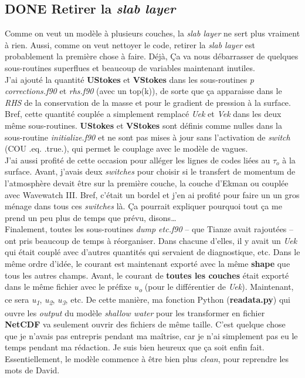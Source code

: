 \documentclass[10pt]{article}
\numberwithin{equation}{section}
\begin{document}
\subsection{{\bfseries\sffamily DONE} Retirer la \emph{slab layer}}
\label{sec:orgb0eaa03}
Comme on veut un modèle à plusieurs couches, la \emph{slab layer} ne sert plus vraiment à rien.
Aussi, comme on veut nettoyer le code, retirer la \emph{slab layer} est probablement la première chose à faire. 
Déjà, Ça va nous débarrasser de quelques sous-routines superflues et beaucoup de variables maintenant inutiles.\\[0pt]

J'ai ajouté la quantité \textbf{UStokes} et \textbf{VStokes} dans les sous-routines \emph{p corrections.f90} et \emph{rhs.f90} (avec un top(k)), de sorte que ça apparaisse dans le \emph{RHS} de la conservation de la masse et pour le gradient de pression à la surface. 
Bref, cette quantité couplée a simplement remplacé \emph{Uek} et \emph{Vek} dans les deux même sous-routines.
\textbf{UStokes} et \textbf{VStokes} sont définis comme nulles dans la sous-routine \emph{initialize.f90} et ne sont pas mises à jour sans l'activation de \emph{switch} (COU .eq. .true.), qui permet le couplage avec le modèle de vagues.\\[0pt]

J'ai aussi profité de cette occasion pour alléger les lignes de codes liées au \(\tau_o\) à la surface. 
Avant, j'avais deux \emph{switches} pour choisir si le transfert de momentum de l'atmosphère devait être sur la première couche, la couche d'Ekman ou couplée avec Wavewatch III.
Bref, c'était un bordel et j'en ai profité pour faire un un gros ménage dans tous ces \emph{switches} là.
Ça pourrait expliquer pourquoi tout ça me prend un peu plus de temps que prévu, disons\ldots{}\\[0pt]

Finalement, toutes les sous-routines \emph{dump etc.f90} -- que Tianze avait rajoutées -- ont pris beaucoup de temps à réorganiser.
Dans chacune d'elles, il y avait un \emph{Uek} qui était couplé avec d'autres quantités qui servaient de diagnostique, etc.
Dans le même ordre d'idée, le courant est maintenant exporté avec la même \textbf{shape} que tous les autres champs.
Avant, le courant de \textbf{toutes les couches} était exporté dans le même fichier avec le préfixe \emph{u\textsubscript{o}} (pour le différentier de \emph{Uek}). 
Maintenant, ce sera \emph{u\textsubscript{1}}, \emph{u\textsubscript{2}}, \emph{u\textsubscript{3}}, etc.
De cette manière, ma fonction Python (\textbf{readata.py}) qui ouvre les \emph{output} du modèle \emph{shallow water} pour les transformer en fichier \textbf{NetCDF} va seulement ouvrir des fichiers de même taille.
C'est quelque chose que je n'avais pas entrepris pendant ma maîtrise, car je n'ai simplement pas eu le temps pendant ma rédaction.
Je suis bien heureux que ça soit enfin fait.
Essentiellement, le modèle commence à être bien plus \emph{clean}, pour reprendre les mots de David.\\[0pt]
\end{document}
